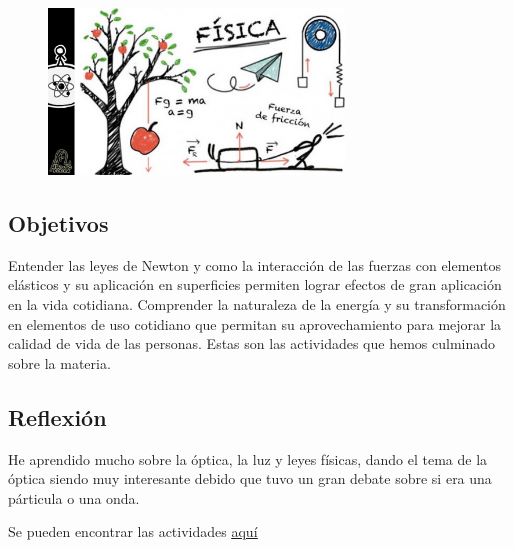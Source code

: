 \documentclass[a4paper, 12pt]{article}
\begin{document}
\begin{figure}[h]
  \includegraphics[width=0.7\textwidth, center]{fisi.jpeg}
\end{figure}

\subsection{Objetivos}
Entender las leyes de Newton y como la interacción de las fuerzas con elementos elásticos y su aplicación en superficies permiten lograr efectos de gran aplicación en la vida cotidiana. Comprender la naturaleza de la energía y su transformación en elementos de uso cotidiano que permitan su aprovechamiento para mejorar la calidad de vida de las personas.
Estas son las actividades que hemos culminado sobre la materia.

\subsection{Reflexión}
He aprendido mucho sobre la óptica, la luz y leyes físicas, dando el tema de la óptica siendo muy interesante debido que tuvo un gran debate sobre si era una párticula o una onda.

Se pueden encontrar las actividades \href{https://drive.google.com/drive/folders/1TrRKvzmpVNuXv89DHbMKKkIT746Uk8yG?usp=sharing}{\underline{aquí}}
\end{document}

